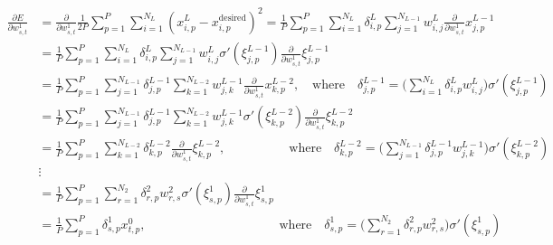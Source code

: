 \begin{equation}
\begin{split}
\frac{\partial E}{\partial w_{s, t}^1}
    & = \frac{\partial}{\partial w_{s, t}^1} \frac{1}{2P} \sum_{p=1}^P{ \sum_{i=1}^{N_L}{ ( x_{i, p}^L - x_{i, p}^\text{desired} )^2 } }
    = \frac{1}{P} \sum_{p=1}^P{ \sum_{i=1}^{N_L}{ \delta_{i, p}^L } \sum_{j = 1}^{N_{L-1}}{ w_{i, j}^L \frac{\partial}{\partial w_{s, t}^1} x_{j, p}^{L-1} } } \\
    & = \frac{1}{P} \sum_{p=1}^P{ \sum_{i=1}^{N_L}{ \delta_{i, p}^L } \sum_{j = 1}^{N_{L-1}}{ w_{i, j}^L \sigma'(\xi_{j, p}^{L-1}) \frac{\partial}{\partial w_{s, t}^1} \xi_{j, p}^{L-1} } } \\
    & = \frac{1}{P} \sum_{p=1}^P{ \sum_{j = 1}^{N_{L-1}}{ \delta_{j, p}^{L-1} \sum_{k = 1}^{N_{L-2}}{ w_{j, k}^{L-1} \frac{\partial}{\partial w_{s, t}^1} x_{k, p}^{L-2} } } }
    , \quad \text{where} \quad \delta_{j, p}^{L-1} = \Big( \sum_{i=1}^{N_L}{ \delta_{i, p}^L w_{i, j}^L } \Big) \sigma'( \xi_{j, p}^{L-1} ) \\
    & = \frac{1}{P} \sum_{p=1}^P{ \sum_{j = 1}^{N_{L-1}}{ \delta_{j, p}^{L-1} \sum_{k = 1}^{N_{L-2}}{ w_{j, k}^{L-1} \sigma'(\xi_{k, p}^{L-2}) \frac{\partial}{\partial w_{s, t}^1} \xi_{k, p}^{L-2} } } } \\
    & = \frac{1}{P} \sum_{p=1}^P{ \sum_{k = 1}^{N_{L-2}}{ \delta_{k, p}^{L-2} \frac{\partial}{\partial w_{s, t}^1} \xi_{k, p}^{L-2} } }
    , \qquad \qquad \quad \text{where} \quad \delta_{k, p}^{L-2} = \Big( \sum_{j = 1}^{N_{L-1}}{ \delta_{j, p}^{L-1} w_{j, k}^{L-1} } \Big) \sigma'(\xi_{k, p}^{L-2}) \\
    & \vdots \\
    & = \frac{1}{P} \sum_{p=1}^P{ \sum_{r=1}^{N_2}{ \delta_{r, p}^2 w_{r, s}^2 } \sigma'( \xi_{s, p}^1 ) \frac{\partial}{\partial w_{s, t}^1} \xi_{s, p}^1 } \\
    & = \frac{1}{P} \sum_{p=1}^P{ \delta_{s, p}^1 x_{t, p}^0 }
    , \qquad \qquad \qquad \qquad \qquad \, \, \, \text{where} \quad \delta_{s, p}^1 = \Big( \sum_{r=1}^{N_2}{ \delta_{r, p}^2 w_{r, s}^2 } \Big) \sigma'( \xi_{s, p}^1 )
\end{split}
\end{equation}


